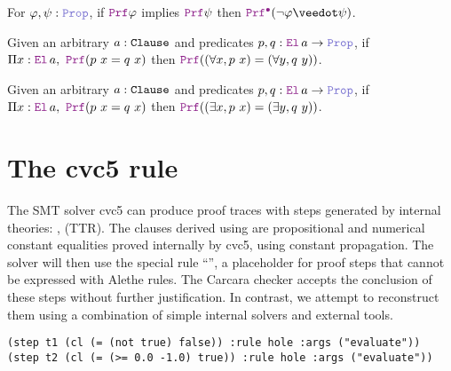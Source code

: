 \begin{lemma}[$\kw{subproof}_1$]\label{lem:subproof}
For $\varphi, \psi : \prop{}$, if $\prf{} \varphi$ implies $\prf{} \psi$ then $\pid (\neg \varphi \veedot \psi)$.
\end{lemma}


\begin{lemma}\label{lem:bind-forall}
Given an arbitrary $a : \texttt{\upshape{Clause}}$ and predicates $p, q : \el{}\,a \ra \prop$, if $\Pi x : \el{}\,a,~ \prf (p~x = q~x)$ then $\prf ((\forall x, p~x) = (\forall y, q~y))$.
\end{lemma}


\begin{lemma}\label{lem:bind-exists}
  Given an arbitrary $a : \texttt{\upshape{Clause}}$ and predicates $p, q : \el{}\,a \ra \prop$, if $\Pi x : \el{}\,a,~ \prf (p~x = q~x)$ then $\prf ((\exists x, p~x) = (\exists y, q~y))$.
\end{lemma}



\section{The \texttt{} cvc5 rule}
\label{ssec:eval-recon}

The SMT solver cvc5 can produce proof traces with steps generated by internal theories: ,  (TTR).
The clauses derived using  are propositional and numerical constant equalities proved internally by cvc5, using constant propagation.
The solver will then use the special rule ``'', a placeholder for proof steps that cannot be expressed with Alethe rules.
The Carcara checker accepts the conclusion of these  steps without further justification.
In contrast, we attempt to reconstruct them using a combination of simple internal solvers and external tools.

\smallskip

\begin{lstlisting}[language=SMT,caption={An example of proof trace using the cvc5 $\kw{evaluate}$ rule.},label={lst:eval-step}]
(step t1 (cl (= (not true) false)) :rule hole :args ("evaluate"))
(step t2 (cl (= (>= 0.0 -1.0) true)) :rule hole :args ("evaluate"))
\end{lstlisting}

\smallskip

